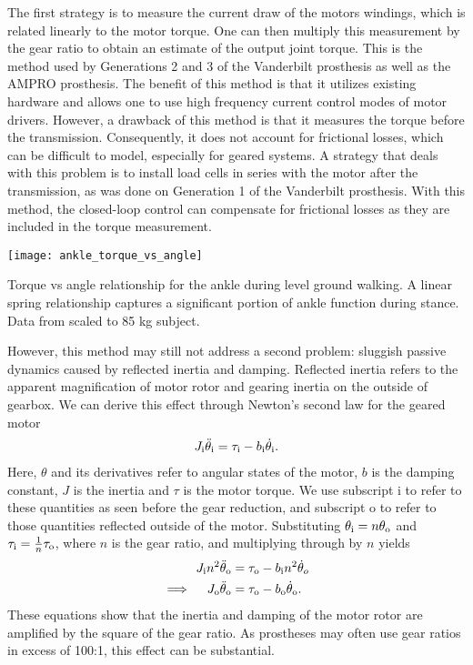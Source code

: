 The first strategy is to measure the current draw of the motors windings, which
is related linearly to the motor torque. One can then multiply this measurement
by the gear ratio to obtain an estimate of the output joint torque. This is the
method used by Generations 2 and 3 of the Vanderbilt prosthesis as well as the
AMPRO prosthesis. The benefit of this method is that it utilizes existing
hardware and allows one to use high frequency current control modes of motor
drivers. However, a drawback of this method is that it measures the torque
before the transmission. Consequently, it does not account for frictional
losses, which can be difficult to model, especially for geared systems. A
strategy that deals with this problem is to install load cells in series with
the motor after the transmission, as was done on Generation 1 of the Vanderbilt
prosthesis. With this method, the closed-loop control can compensate for
frictional losses as they are included in the torque measurement. 
\begin{marginfigure}
    \centering
    \texttt{[image: ankle\_torque\_vs\_angle]}
    \caption{Torque vs angle relationship for the ankle during level ground
    walking. A linear spring relationship captures a significant portion of
    ankle function during stance. Data from \citet{winter2009biomechanics}
    scaled to 85 kg subject.}
    \label{fig:ankle_torque_vs_angle}
\end{marginfigure}

However, this method may still not address a second problem: sluggish passive
dynamics caused by reflected inertia and damping. Reflected inertia refers to
the apparent magnification of motor rotor and gearing inertia on the outside of
gearbox.  We can derive this effect through Newton's second law for the geared
motor
\begin{align}
    J_{\mathrm{i}} \ddot{\theta}_{\mathrm{i}} = \tau_{\mathrm{i}} - b_{\mathrm{i}} \dot{\theta}_{\mathrm{i}}.
\end{align}
Here, $\theta$ and its derivatives refer to angular states of the motor, $b$ is
the damping constant, $J$ is the inertia and $\tau$ is the motor torque. We use
subscript i to refer to these quantities as seen before the gear reduction, and
subscript o to refer to those quantities reflected outside of the motor.
Substituting $\theta_{\mathrm{i}} = n \theta_{\mathrm{o}}$ and $\tau_{\mathrm{i}} = \frac{1}{n}
\tau_{\mathrm{o}}$, where $n$ is the gear ratio, and multiplying through by $n$ yields
\begin{align}
    J_{\mathrm{i}} n^2 \ddot{\theta}_{\mathrm{o}} 
        &= \tau_{\mathrm{o}} - b_{\mathrm{i}} n^2 \dot{\theta}_o \\
    \implies \quad J_{\mathrm{o}} \ddot{\theta}_{\mathrm{o}} 
        &= \tau_{\mathrm{o}} - b_{\mathrm{o}} \dot{\theta}_{\mathrm{o}}.
\end{align}
These equations show that the inertia and damping of the motor rotor are
amplified by the square of the gear ratio. As prostheses may often use gear
ratios in excess of 100:1, this effect can be substantial. 

